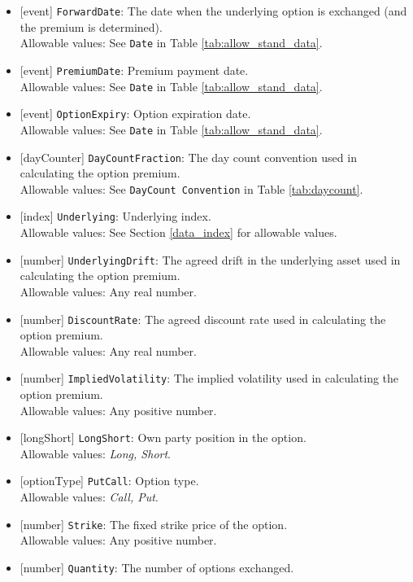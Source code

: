 \begin{itemize} 
  \item{}[event] \lstinline!ForwardDate!: The date when the underlying option is exchanged (and the premium is determined). \\
  Allowable values: See \lstinline!Date! in Table \ref{tab:allow_stand_data}.
  \item{}[event] \lstinline!PremiumDate!: Premium payment date. \\
  Allowable values: See \lstinline!Date! in Table \ref{tab:allow_stand_data}.
  \item{}[event] \lstinline!OptionExpiry!: Option expiration date. \\
  Allowable values: See \lstinline!Date! in Table \ref{tab:allow_stand_data}.
  \item{}[dayCounter] \lstinline!DayCountFraction!: The day count convention used in calculating the option premium. \\
  Allowable values: See \lstinline!DayCount Convention! in Table \ref{tab:daycount}.
  \item{}[index] \lstinline!Underlying!: Underlying index. \\
  Allowable values: See Section \ref{data_index} for allowable values.
  \item{}[number] \lstinline!UnderlyingDrift!: The agreed drift in the underlying asset used in calculating the option premium. \\
  Allowable values: Any real number.
  \item{}[number] \lstinline!DiscountRate!: The agreed discount rate used in calculating the option premium. \\
  Allowable values: Any real number.
  \item{}[number] \lstinline!ImpliedVolatility!: The implied volatility used in calculating the option premium. \\
  Allowable values: Any positive number.
  \item{}[longShort] \lstinline!LongShort!: Own party position in the option. \\
  Allowable values: \emph{Long, Short}.
  \item{}[optionType] \lstinline!PutCall!: Option type. \\
  Allowable values: \emph{Call, Put}.
  \item{}[number] \lstinline!Strike!: The fixed strike price of the option. \\
  Allowable values: Any positive number.
  \item{}[number] \lstinline!Quantity!: The number of options exchanged. \\

\end{itemize}
